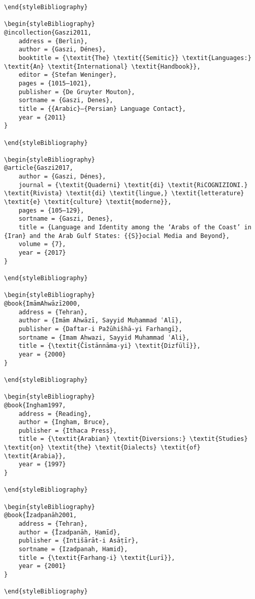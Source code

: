 \documentclass[output=paper]{langsci/langscibook}
\begin{document}
\begin{verbatim}
\end{styleBibliography}

\begin{styleBibliography}
@incollection{Gaszi2011,
	address = {Berlin},
	author = {Gaszi, Dénes},
	booktitle = {\textit{The} \textit{{Semitic}} \textit{Languages:} \textit{An} \textit{International} \textit{Handbook}},
	editor = {Stefan Weninger},
	pages = {1015–1021},
	publisher = {De Gruyter Mouton},
	sortname = {Gaszi, Denes},
	title = {{Arabic}–{Persian} Language Contact},
	year = {2011}
}

\end{styleBibliography}

\begin{styleBibliography}
@article{Gaszi2017,
	author = {Gaszi, Dénes},
	journal = {\textit{Quaderni} \textit{di} \textit{RiCOGNIZIONI.} \textit{Rivista} \textit{di} \textit{lingue,} \textit{letterature} \textit{e} \textit{culture} \textit{moderne}},
	pages = {105–129},
	sortname = {Gaszi, Denes},
	title = {Language and Identity among the ‘Arabs of the Coast’ in {Iran} and the Arab Gulf States: {{S}}ocial Media and Beyond},
	volume = {7},
	year = {2017}
}

\end{styleBibliography}

\begin{styleBibliography}
@book{ImāmAhwāzī2000,
	address = {Tehran},
	author = {Imām Ahwāzī, Sayyid Muḥammad ʿAlī},
	publisher = {Daftar-i Pažūhišhā-yi Farhangī},
	sortname = {Imam Ahwazi, Sayyid Muhammad ʿAli},
	title = {\textit{Čīstānnāma-yi} \textit{Dizfūlī}},
	year = {2000}
}

\end{styleBibliography}

\begin{styleBibliography}
@book{Ingham1997,
	address = {Reading},
	author = {Ingham, Bruce},
	publisher = {Ithaca Press},
	title = {\textit{Arabian} \textit{Diversions:} \textit{Studies} \textit{on} \textit{the} \textit{Dialects} \textit{of} \textit{Arabia}},
	year = {1997}
}

\end{styleBibliography}

\begin{styleBibliography}
@book{Īzadpanāh2001,
	address = {Tehran},
	author = {Īzadpanāh, Ḥamīd},
	publisher = {Intišārāt-i Asāṭīr},
	sortname = {Izadpanah, Hamid},
	title = {\textit{Farhang-i} \textit{Lurī}},
	year = {2001}
}

\end{styleBibliography}


\end{verbatim}
\end{document}
